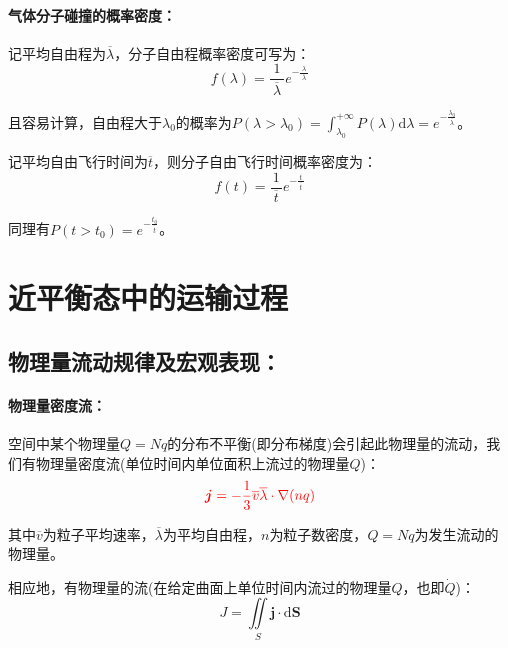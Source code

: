 \documentclass[zihao=5,UTF8]{report}
\begin{document}
\subsubsection{气体分子碰撞的概率密度：}
记平均自由程为$\overline{\lambda}$，分子自由程概率密度可写为：
\begin{equation}
    f(\lambda) = \frac{1}{\ \overline{\lambda}\ }e^{-\frac{\lambda}{\ \overline{\lambda}\ }}
\end{equation}\par
且容易计算，自由程大于$\lambda_0$的概率为$P(\lambda >\lambda_0) = \int_{\lambda_0}^{+\infty} P(\lambda)\mathrm{d}\lambda = e^{-\frac{\lambda_0}{\ \overline{\lambda}\ }}$。\par
记平均自由飞行时间为$\overline{t}$，则分子自由飞行时间概率密度为：
\begin{equation}
    f(t) = \frac{1}{\ \overline{t}\ }e^{-\frac{t}{\ \overline{t}\ }}
\end{equation}\par
同理有$P(t>t_0) = e^{-\frac{t_0}{\ \overline{t}\ }}$。
\chapter{近平衡态中的运输过程}
\section{物理量流动规律及宏观表现：}
\subsubsection{物理量密度流：}
空间中某个物理量$Q = N q$的分布不平衡(即分布梯度)会引起此物理量的流动，我们有物理量密度流(单位时间内单位面积上流过的物理量$Q$)：
\begin{equation}
    \textcolor{red}{\boldsymbol{j}= -\frac{1}{3} \overline{v}\overline{\lambda} \cdot  \nabla (nq)}
\end{equation}\par
{\color{gray}\small 其中$\overline{v}$为粒子平均速率，$\overline{\lambda}$为平均自由程，$n$为粒子数密度，$Q = Nq$为发生流动的物理量。}\par
相应地，有物理量的流(在给定曲面上单位时间内流过的物理量$Q$，也即$\dot Q$)：
\begin{equation}
    J =  \iint\limits_{S} \boldsymbol{j}\cdot \mathrm{d}\boldsymbol{S}
\end{equation}
\end{document}
